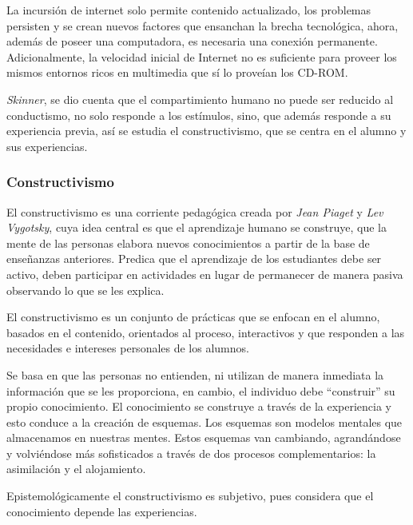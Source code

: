 La incursión de internet solo permite contenido actualizado, los problemas
persisten y se crean nuevos factores que ensanchan la brecha tecnológica,
ahora, además de poseer una computadora, es necesaria una conexión permanente.
Adicionalmente, la velocidad inicial de Internet no es suficiente para proveer
los mismos entornos ricos en multimedia que sí lo proveían los
CD-ROM\cite{leinonen:ict}.

\textit{Skinner}, se dio cuenta que el compartimiento humano no puede ser
reducido al conductismo, no solo responde a los estímulos, sino, que además
responde a su experiencia previa\cite{weegar2012comparison}, así se estudia el
constructivismo, que se centra en el alumno y sus experiencias.

\subsubsection{Constructivismo}

El constructivismo es una corriente pedagógica creada por \textit{Jean Piaget}
y \textit{Lev Vygotsky}, cuya idea central es que el aprendizaje humano se
construye, que la mente de las personas elabora nuevos conocimientos a partir
de la base de enseñanzas anteriores. Predica que el aprendizaje de los
estudiantes debe ser activo, deben participar en actividades en lugar de
permanecer de manera pasiva observando lo que se les
explica\cite{hernandez:constructivismo,johnson2005instructionism}.

El constructivismo es un conjunto de prácticas que se enfocan en el alumno,
basados en el contenido, orientados al proceso, interactivos y que responden a
las necesidades e intereses personales de los
alumnos\cite{johnson2005instructionism}.

Se basa en que las personas no entienden, ni utilizan de manera inmediata la
información que se les proporciona, en cambio, el individuo debe
\enquote{construir} su propio conocimiento. El conocimiento se construye a
través de la experiencia y esto conduce a la creación de esquemas. Los esquemas
son modelos mentales que almacenamos en nuestras mentes. Estos esquemas van
cambiando, agrandándose y volviéndose más sofisticados a través de dos procesos
complementarios: la asimilación y el
alojamiento\cite{hernandez:constructivismo,johnson2005instructionism}.

Epistemológicamente el constructivismo es subjetivo, pues considera que el
conocimiento depende las experiencias\cite{johnson2005instructionism}. 

